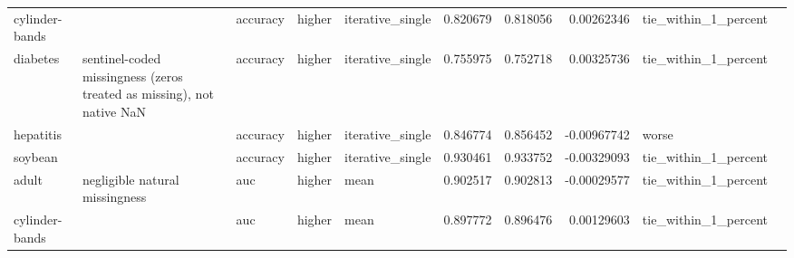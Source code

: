 \begin{table}[ht]
{\begin{tabular}{lllllrrrll}
 cylinder-bands &                                                                       & accuracy                       & higher             & iterative\_single &                   0.820679 &               0.818056 &                     0.00262346  & tie\_within\_1\_percent &                                                                                                                    \\
 diabetes       & sentinel-coded missingness (zeros treated as missing), not native NaN & accuracy                       & higher             & iterative\_single &                   0.755975 &               0.752718 &                     0.00325736  & tie\_within\_1\_percent &                                                                                                                    \\
 hepatitis      &                                                                       & accuracy                       & higher             & iterative\_single &                   0.846774 &               0.856452 &                    -0.00967742  & worse                &                                                                                                                    \\
 soybean        &                                                                       & accuracy                       & higher             & iterative\_single &                   0.930461 &               0.933752 &                    -0.00329093  & tie\_within\_1\_percent &                                                                                                                    \\
 adult          & negligible natural missingness                                        & auc                            & higher             & mean             &                   0.902517 &               0.902813 &                    -0.00029577  & tie\_within\_1\_percent &                                                                                                                    \\
 cylinder-bands &                                                                       & auc                            & higher             & mean             &                   0.897772 &               0.896476 &                     0.00129603  & tie\_within\_1\_percent &                                                                                                                    \\

\end{tabular}}
\end{table}

